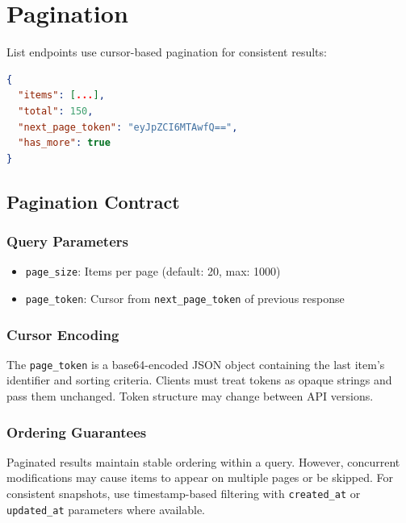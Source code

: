 \section{Pagination}
\label{app:api:pagination}

List endpoints use cursor-based pagination for consistent results:

\begin{lstlisting}[language=json]
{
  "items": [...],
  "total": 150,
  "next_page_token": "eyJpZCI6MTAwfQ==",
  "has_more": true
}
\end{lstlisting}

\subsection{Pagination Contract}

\subsubsection{Query Parameters}
\begin{itemize}
    \item \texttt{page\_size}: Items per page (default: 20, max: 1000)
    \item \texttt{page\_token}: Cursor from \texttt{next\_page\_token} of previous response
\end{itemize}

\subsubsection{Cursor Encoding}

The \texttt{page\_token} is a base64-encoded JSON object containing the last item's identifier and sorting criteria. Clients must treat tokens as opaque strings and pass them unchanged. Token structure may change between API versions.

\subsubsection{Ordering Guarantees}

Paginated results maintain stable ordering within a query. However, concurrent modifications may cause items to appear on multiple pages or be skipped. For consistent snapshots, use timestamp-based filtering with \texttt{created\_at} or \texttt{updated\_at} parameters where available.

